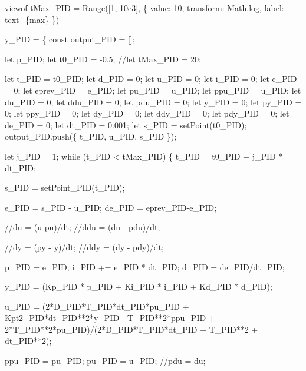 \documentclass[
  letterpaper,
  DIV=11]{scrreprt}
\newenvironment{Shaded}{\begin{snugshade}}{\end{snugshade}}
\newcommand{\NormalTok}[1]{\textcolor[rgb]{0.00,0.23,0.31}{#1}}
\begin{document}
\begin{Shaded}
\begin{Highlighting}[]

\NormalTok{viewof tMax\_PID = Range([1, 10e3], \{}
\NormalTok{  value: 10,}
\NormalTok{  transform: Math.log,}
\NormalTok{  label: tex\textasciigrave{}t\_\{max\}\textasciigrave{}}
\NormalTok{\})}

\NormalTok{y\_PID = \{}
\NormalTok{  const output\_PID = [];}

\NormalTok{  let p\_PID; }
\NormalTok{  let t0\_PID = {-}0.5;}
\NormalTok{  //let tMax\_PID = 20;}

\NormalTok{  let t\_PID = t0\_PID;}
\NormalTok{  let d\_PID = 0;}
\NormalTok{  let u\_PID = 0;}
\NormalTok{  let i\_PID = 0;}
\NormalTok{  let e\_PID = 0;}
\NormalTok{  let eprev\_PID = e\_PID;}
\NormalTok{  let pu\_PID = u\_PID;}
\NormalTok{  let ppu\_PID = u\_PID;}
\NormalTok{  let du\_PID = 0;}
\NormalTok{  let ddu\_PID = 0;}
\NormalTok{  let pdu\_PID = 0;}
\NormalTok{  let y\_PID = 0;}
\NormalTok{  let py\_PID = 0;}
\NormalTok{  let ppy\_PID = 0;}
\NormalTok{  let dy\_PID = 0;}
\NormalTok{  let ddy\_PID = 0;}
\NormalTok{  let pdy\_PID = 0;}
\NormalTok{  let de\_PID = 0;}
\NormalTok{  let dt\_PID = 0.001;}
\NormalTok{  let s\_PID = setPoint(t0\_PID);}
\NormalTok{  output\_PID.push(\{ t\_PID, u\_PID, s\_PID \});}

\NormalTok{  let j\_PID = 1;}
\NormalTok{  while (t\_PID \textless{} tMax\_PID) \{}
\NormalTok{    t\_PID = t0\_PID + j\_PID * dt\_PID;}

\NormalTok{    s\_PID = setPoint\_PID(t\_PID);}
   
\NormalTok{    e\_PID = s\_PID {-} u\_PID;}
\NormalTok{    de\_PID = eprev\_PID{-}e\_PID;}

\NormalTok{    //du = (u{-}pu)/dt;}
\NormalTok{    //ddu = (du {-} pdu)/dt;}

\NormalTok{    //dy = (py {-} y)/dt;}
\NormalTok{    //ddy = (dy {-} pdy)/dt;}

\NormalTok{    p\_PID = e\_PID;}
\NormalTok{    i\_PID += e\_PID * dt\_PID;}
\NormalTok{    d\_PID = de\_PID/dt\_PID;}

\NormalTok{    y\_PID = (Kp\_PID * p\_PID + Ki\_PID * i\_PID + Kd\_PID * d\_PID);}
    
\NormalTok{    u\_PID = (2*D\_PID*T\_PID*dt\_PID*pu\_PID + Kpt2\_PID*dt\_PID**2*y\_PID {-} T\_PID**2*ppu\_PID + 2*T\_PID**2*pu\_PID)/(2*D\_PID*T\_PID*dt\_PID + T\_PID**2 + dt\_PID**2);}

\NormalTok{    ppu\_PID = pu\_PID;}
\NormalTok{    pu\_PID = u\_PID;}
\NormalTok{    //pdu = du;}


\end{Highlighting}
\end{Shaded}
\end{document}
